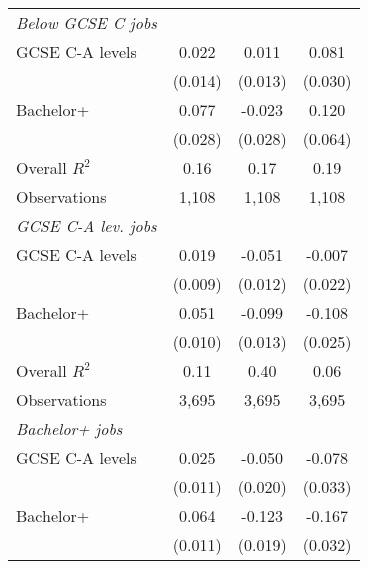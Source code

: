 \begin{center}
\begin{threeparttable}[!h]
\begin{tabular}{lccc}
\midrule\textit{Below GCSE C jobs}\vspace{1mm} \\ 
\hspace{3mm}GCSE C-A levels&       0.022         &       0.011         &       0.081\sym{**} \\
                    &     (0.014)         &     (0.013)         &     (0.030)         \\
\hspace{3mm}Bachelor+&       0.077\sym{**} &      -0.023         &       0.120         \\
                    &     (0.028)         &     (0.028)         &     (0.064)         \\
\midrule Overall $ R^2$&        0.16         &        0.17         &        0.19         \\
Observations        &       1,108         &       1,108         &       1,108         \\
\midrule\textit{GCSE C-A lev. jobs}\vspace{1mm} \\ 
\hspace{3mm}GCSE C-A levels&       0.019\sym{*}  &      -0.051\sym{***}&      -0.007         \\
                    &     (0.009)         &     (0.012)         &     (0.022)         \\
\hspace{3mm}Bachelor+&       0.051\sym{***}&      -0.099\sym{***}&      -0.108\sym{***}\\
                    &     (0.010)         &     (0.013)         &     (0.025)         \\
\midrule Overall $ R^2$&        0.11         &        0.40         &        0.06         \\
Observations        &       3,695         &       3,695         &       3,695         \\
\midrule\textit{Bachelor+ jobs}\vspace{1mm} \\ 
\hspace{3mm}GCSE C-A levels&       0.025\sym{*}  &      -0.050\sym{*}  &      -0.078\sym{*}  \\
                    &     (0.011)         &     (0.020)         &     (0.033)         \\
\hspace{3mm}Bachelor+&       0.064\sym{***}&      -0.123\sym{***}&      -0.167\sym{***}\\
                    &     (0.011)         &     (0.019)         &     (0.032)         \\

\end{tabular}
\end{threeparttable}
\end{center}
